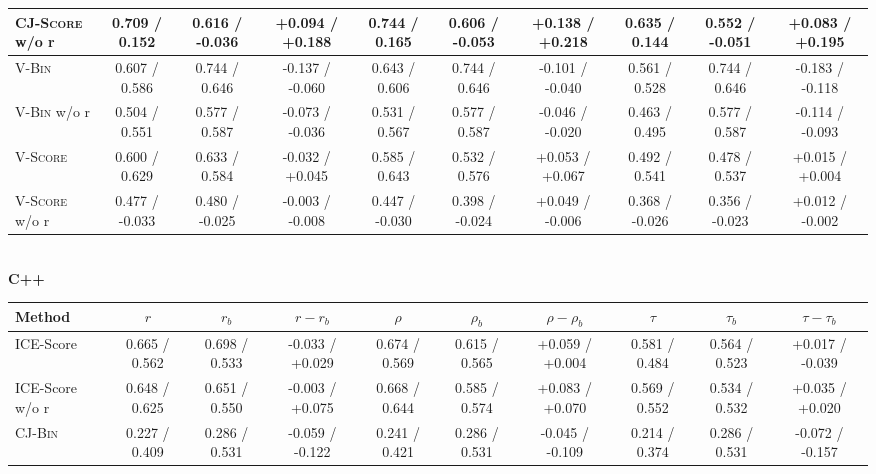 \begin{table}[t]
\begin{tabular}{@{}l|ccc|ccc|ccc@{}}
        \textsc{CJ-Score} w/o r & 0.709 / 0.152   & 0.616 / -0.036  & +0.094 / +0.188                     & 0.744 / 0.165   & 0.606 / -0.053  & +0.138 / +0.218                     & 0.635 / 0.144   & 0.552 / -0.051  & +0.083 / +0.195                     \\
        \midrule
        \textsc{V-Bin}          & 0.607 / 0.586   & 0.744 / 0.646   & -0.137 / -0.060                     & 0.643 / 0.606   & 0.744 / 0.646   & -0.101 / -0.040                     & 0.561 / 0.528   & 0.744 / 0.646   & -0.183 / -0.118                     \\
        \textsc{V-Bin} w/o r    & 0.504 / 0.551   & 0.577 / 0.587   & -0.073 / -0.036                     & 0.531 / 0.567   & 0.577 / 0.587   & -0.046 / -0.020                     & 0.463 / 0.495   & 0.577 / 0.587   & -0.114 / -0.093                     \\
        \textsc{V-Score}        & 0.600 / 0.629   & 0.633 / 0.584   & -0.032 / +0.045                     & 0.585 / 0.643   & 0.532 / 0.576   & +0.053 / +0.067                     & 0.492 / 0.541   & 0.478 / 0.537   & +0.015 / +0.004                     \\
        \textsc{V-Score} w/o r  & 0.477 / -0.033  & 0.480 / -0.025  & -0.003 / -0.008                     & 0.447 / -0.030  & 0.398 / -0.024  & +0.049 / -0.006                     & 0.368 / -0.026  & 0.356 / -0.023  & +0.012 / -0.002                     \\
        \bottomrule
    \end{tabular}
    \\[7pt]
    {\bf C++}\\
    \begin{tabular}{@{}l|ccc|ccc|ccc@{}}
        \toprule
        Method & $r$ & $r_b$ & $r-r_b$ & $\rho$ & $\rho_b$ & $\rho-\rho_b$ & $\tau$ & $\tau_b$ & $\tau-\tau_b$ \\
        \midrule
        ICE-Score               & 0.665 / 0.562   & 0.698 / 0.533   & -0.033 / +0.029                     & 0.674 / 0.569   & 0.615 / 0.565   & +0.059 / +0.004                     & 0.581 / 0.484   & 0.564 / 0.523   & +0.017 / -0.039                     \\
        ICE-Score w/o r         & 0.648 / 0.625   & 0.651 / 0.550   & -0.003 / +0.075                     & 0.668 / 0.644   & 0.585 / 0.574   & +0.083 / +0.070                     & 0.569 / 0.552   & 0.534 / 0.532   & +0.035 / +0.020                     \\
        \midrule
        \textsc{CJ-Bin}         & 0.227 / 0.409   & 0.286 / 0.531   & -0.059 / -0.122                     & 0.241 / 0.421   & 0.286 / 0.531   & -0.045 / -0.109                     & 0.214 / 0.374   & 0.286 / 0.531   & -0.072 / -0.157                     \\

\end{tabular}
\end{table}
